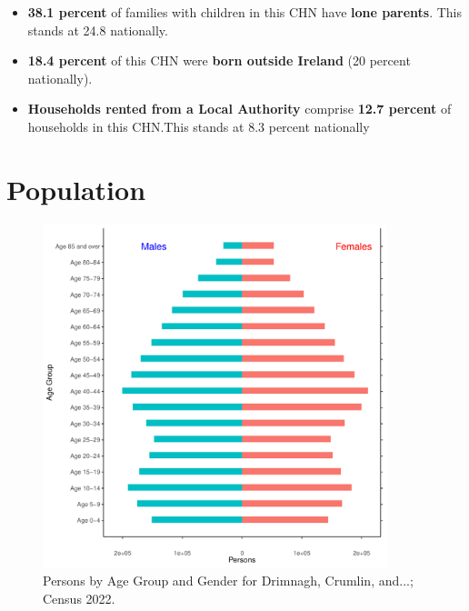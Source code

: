 \documentclass{article}
\begin{document}
\begin{itemize}
\item \textbf{38.1 percent} of families with children in this CHN have \textbf{lone parents}. This stands at 24.8 nationally.

\item \textbf{18.4 percent} of this CHN were \textbf{born outside Ireland} (20 percent nationally).

\item \textbf{Households rented from a Local Authority} comprise \textbf{12.7 percent} of households in this CHN.This stands at 8.3 percent nationally

\end{itemize}

\pagebreak

\section{Population} 
\label{sect:Pop}

\begin{figure}[h]
	\centering
	\includegraphics[width = 100mm]{../figures/PyramidPlot.pdf}
	\caption{Persons by Age Group and Gender for Drimnagh, Crumlin, and...; Census 2022.}
	\label{fig:2ae19629-1a6a-13a3-e055-000000000001}
	\end{figure}
\end{document}
